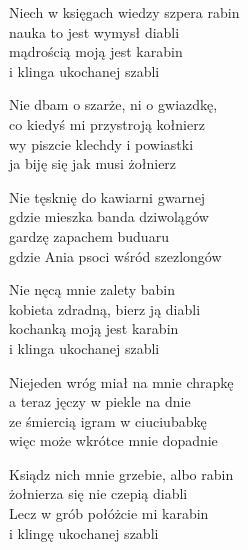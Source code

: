 \begin{text}
    Niech w księgach wiedzy szpera rabin\\
    nauka to jest wymysł diabli\\
    mądrością moją jest karabin\\
    i klinga ukochanej szabli

    Nie dbam o szarże, ni o gwiazdkę,\\
    co kiedyś mi przystroją kołnierz\\
    wy piszcie klechdy i powiastki\\
    ja biję się jak musi żołnierz

    Nie tęsknię do kawiarni gwarnej\\
    gdzie mieszka banda dziwolągów\\
    gardzę zapachem buduaru\\
    gdzie Ania psoci wśród szezlongów

    Nie nęcą mnie zalety babin\\
    kobieta zdradną, bierz ją diabli\\
    kochanką moją jest karabin\\
    i klinga ukochanej szabli

    Niejeden wróg miał na mnie chrapkę\\
    a teraz jęczy w piekle na dnie\\
    ze śmiercią igram w ciuciubabkę\\
    więc może wkrótce mnie dopadnie

    Ksiądz nich mnie grzebie, albo rabin\\
    żołnierza się nie czepią diabli\\
    Lecz w grób połóżcie mi karabin\\
    i klingę ukochanej szabli
\end{text}
\begin{chord}

\end{chord}